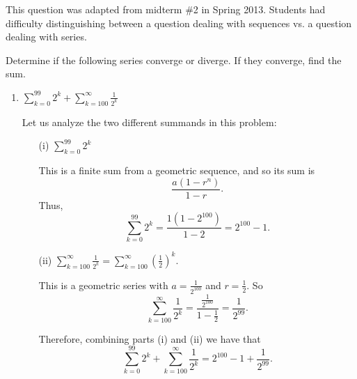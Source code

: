 \documentclass[noinstructornotes]{ximera}
\begin{document}
\begin{instructorNotes}
This question was adapted from midterm \#2 in Spring 2013.  
Students had difficulty distinguishing between a question dealing with sequences vs. a question dealing with series.
\end{instructorNotes}



\begin{problem}
Determine if the following series converge or diverge.  If they converge, find the sum.
	\begin{enumerate}
%	
%	
	
	
	\item  $\sum_{k=0}^{99} 2^k + \sum_{k=100}^\infty \frac{1}{2^k}$
	\begin{freeResponse}
	Let us analyze the two different summands in this problem:
		\begin{enumerate}
		\item[(i)]  $\sum_{k=0}^{99} 2^k$
		
		This is a finite sum from a geometric sequence, and so its sum is 
			\[
			\frac{a(1-r^n)}{1-r}.
			\]
		Thus,
	  		\[
	  		\sum_{k=0}^{99} 2^k = \frac{1(1-2^{100})}{1-2} = 2^{100} - 1.
	  		\]
	  		
		\item[(ii)]  $\sum_{k=100}^\infty \frac{1}{2^k} = \sum_{k=100}^\infty \left( \frac{1}{2} \right)^k$.  
		
		This is a geometric series with $a=\frac{1}{2^{100}}$ and $r = \frac{1}{2}$.  
		So
			\[
			\sum_{k=100}^\infty \frac{1}{2^k} = \frac{\frac{1}{2^{100}}}{1-\frac{1}{2}} = \frac{1}{2^{99}}.
			\]
			
	Therefore, combining parts (i) and (ii) we have that
		\[
		\sum_{k=0}^{99} 2^k + \sum_{k=100}^\infty \frac{1}{2^k} = 2^{100} - 1 + \frac{1}{2^{99}}.
		\]
		\end{enumerate}
	\end{freeResponse}
	

\end{enumerate}
\end{problem}
\end{document}
